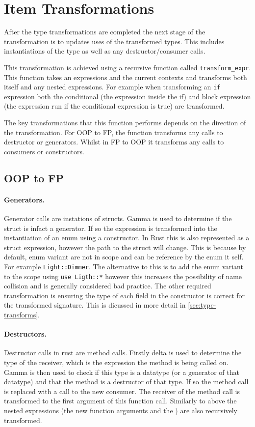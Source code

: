 \documentclass[ oneside,%
                    author={James Elgar},
                    degree={MEng},
                     title={Bidirectional transformer between functional and \\ object-oriented programming in Rust},
                  subtitle={}]{dissertation}
\newcommand{\rust}[1]{\texttt{#1}}
\begin{document}
\section{Item Transformations}
\label{sec:item-trans}

After the type transformations are completed the next stage of the transformation is to updates uses of the transformed types. This includes instantiations of the type as well as any destructor/consumer calls.

This transformation is achieved using a recursive function called \verb|transform_expr|. This function takes an expressions and the current contexts and transforms both itself and any nested expressions. For example when transforming an \verb|if| expression both the conditional (the expression inside the if) and block expression (the expression run if the conditional expression is true) are transformed.

The key transformations that this function performs depends on the direction of the transformation. For OOP to FP, the function transforms any calls to destructor or generators. Whilst in FP to OOP it transforms any calls to consumers or constructors.

\subsection{OOP to FP}

\paragraph{Generators. } Generator calls are instations of structs. Gamma is used to determine if the struct is infact a generator. If so the expression is transformed into the instantiation of an enum using a constructor. In Rust this is also represented as a struct expression, however the path to the struct will change. This is because by default, enum variant are not in scope and can be reference by the enum it self. For example \rust{Light::Dimmer}. The alternative to this is to add the enum variant to the scope using \rust{use Ligth::*} however this increases the possibility of name collision and is generally considered bad practice. The other required transformation is ensuring the type of each field in the constructor is correct for the transformed signature. This is dicussed in more detail in \autoref{sec:type-transforms}.

\paragraph{Destructors. } Destructor calls in rust are method calls. Firstly delta is used to determine the type of the receiver, which is the expression the method is being called on. Gamma is then used to check if this type is a datatype (or a generator of that datatype) and that the method is a destructor of that type. If so the method call is replaced with a call to the new consumer. The receiver of the method call is transformed to the first argument of this function call. Similarly to above the nested expressions (the new function arguments and the ) are also recursively transformed.
\end{document}

